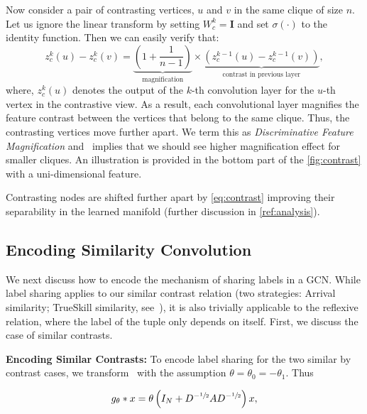 Now consider a pair of contrasting vertices, $u$ and $v$ in the same clique of size $n$. Let us ignore the linear transform by setting $W_{c}^{k}=\mathbf{I}$ and set $\sigma(\cdot)$ to the identity function. Then we can easily verify that:
\begin{equation}
z_c^{k}(u) - z_c^{k}(v) = \underbrace{
  \left (1 + \frac{1}{n-1} \right )
  }_{\text{magnification}}
  \times
  \underbrace{
    \left ( z_c^{k-1}(u) - z_c^{k-1}(v) \right )
    }_{\text{contrast in previous layer}}, \label{eq:disccontrastsimple}
\end{equation}
where, $z_c^{k}(u)$ denotes the output of the $k$-th convolution layer for the $u$-th vertex in the contrastive view. As a result, each convolutional layer magnifies the feature contrast between the vertices that belong to the same clique. Thus, the contrasting vertices move further apart. We term this as \emph{Discriminative Feature Magnification} and~ implies that we should see higher magnification effect for smaller cliques.
An illustration is provided in the bottom part of the \cref{fig:contrast} with a uni-dimensional feature.

Contrasting nodes are shifted further apart by \cref{eq:contrast} improving their separability in the learned manifold (further discussion in \cref{ref:analysis}).

\subsection{Encoding Similarity Convolution}
\label{subsec:similar}
We next discuss how to encode the mechanism of sharing labels in a GCN. While label sharing applies to our similar contrast relation (two strategies: Arrival similarity; TrueSkill similarity, see~), it is also trivially applicable to the reflexive relation, where the label of the tuple only depends on itself. First, we discuss the case of similar contrasts.

\noindent
\textbf{Encoding Similar Contrasts:}
\label{sub:Encoding Similar Contrasts}
To encode label sharing for the two similar by contrast cases, we transform~ with the assumption $\theta = \theta_0 = -\theta_1$. Thus

\begin{equation}
g_{\theta} * x = \theta\left(I_{N} + D^{-\sfrac{1}{2}}AD^{-\sfrac{1}{2}}\right) x, \label{eq:similargcn}
\end{equation}

